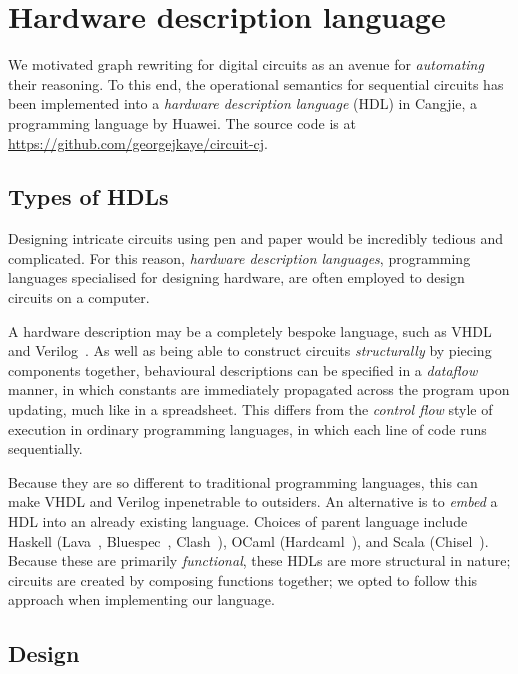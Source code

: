 \section{Hardware description language}\label{sec:hdl}

We motivated graph rewriting for digital circuits as an avenue for
\emph{automating} their reasoning.
To this end, the operational semantics for sequential circuits has been
implemented into a \emph{hardware description language} (HDL) in Cangjie, a
programming language by Huawei.
The source code is at \url{https://github.com/georgejkaye/circuit-cj}.

\subsection{Types of HDLs}

Designing intricate circuits using pen and paper would be incredibly tedious and
complicated.
For this reason, \emph{hardware description languages}, programming languages
specialised for designing hardware, are often employed to design circuits on a
computer.

A hardware description may be a completely bespoke language, such as
VHDL~\cite{ieeecomputersociety1988ieee}
and Verilog~\cite{ieeecomputersociety1996ieee}.
As well as being able to construct circuits \emph{structurally} by piecing
components together, behavioural descriptions
can be specified in a \emph{dataflow} manner, in which constants are immediately
propagated across the program upon updating, much like in a spreadsheet.
This differs from the \emph{control flow} style of execution in ordinary
programming languages, in which each line of code runs sequentially.

Because they are so different to traditional programming languages, this can
make VHDL and Verilog inpenetrable to outsiders.
An alternative is to \emph{embed} a HDL into an already existing language.
Choices of parent language include Haskell (Lava~\cite{bjesse1998lava},
Bluespec~\cite{nikhil2004bluespec},
Clash~\cite{kooijman2009haskell,baaij2010clash}), OCaml
(Hardcaml~\cite{ray2023hardcaml}), and Scala (Chisel~\cite{bachrach2012chisel}).
Because these are primarily \emph{functional}, these HDLs are more structural in
nature; circuits are created by composing functions together; we opted to follow
this approach when implementing our language.

\subsection{Design}

